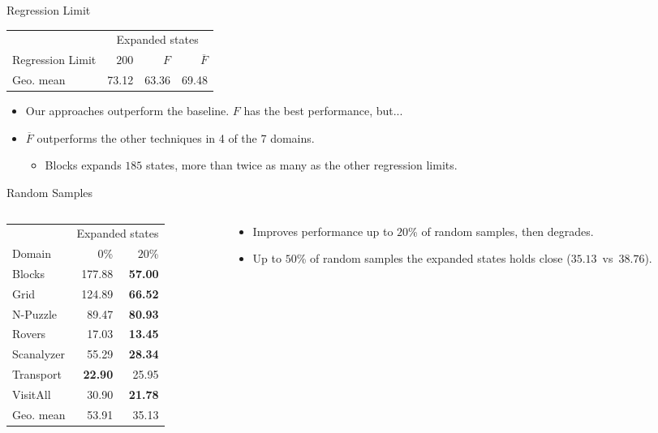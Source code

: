 \documentclass{gkibeamer}
\providecommand{\facts}{\ensuremath{F}\xspace}
\providecommand{\meanfx}{\ensuremath{\overline{F}}\xspace}
\providecommand{\default}{\ensuremath{200}\xspace}
\begin{document}
\begin{frame}{Regression Limit} %
\begin{table}[]
\begin{tabular}{l|rrr}
    & \multicolumn{3}{c}{Expanded states} \\
    Regression Limit & \default & \facts & \meanfx \\
    \hline
    Geo. mean & 73.12 & 63.36 & 69.48 \\
\end{tabular}
\end{table}
\begin{itemize}
    \pause
    \item Our approaches outperform the baseline. \facts has the best performance, but...
    \pause
    \item \meanfx outperforms the other techniques in 4 of the 7 domains.
    \begin{itemize}
        \item Blocks expands $185$ states, more than twice as many as the other regression limits.
    \end{itemize}
\end{itemize}
\end{frame}

\begin{frame}{Random Samples} %
\begin{columns}
\begin{column}{0.5\textwidth}
    \begin{table}[]
    \begin{tabular}{l|rr}
        & \multicolumn{2}{c}{Expanded states} \\
        Domain & $0$\% & $20$\% \\
        \hline
        Blocks & 177.88 & \textbf{57.00} \\
        Grid & 124.89 & \textbf{66.52} \\
        N-Puzzle & 89.47 & \textbf{80.93} \\
        Rovers & 17.03 & \textbf{13.45} \\
        Scanalyzer & 55.29 & \textbf{28.34} \\
        Transport & \textbf{22.90} & 25.95 \\
        VisitAll & 30.90 & \textbf{21.78} \\
        \hline
        Geo. mean & 53.91 & 35.13 \\
    \end{tabular}
    \end{table}
\end{column}
\begin{column}{0.5\textwidth}
    \begin{itemize}
        \pause
        \item Improves performance up to $20$\% of random samples, then degrades.
        \pause
        \item Up to $50$\% of random samples the expanded states holds close ($35.13$~vs~$38.76$).
    \end{itemize}
\end{column}
\end{columns}
\end{frame}
\end{document}
